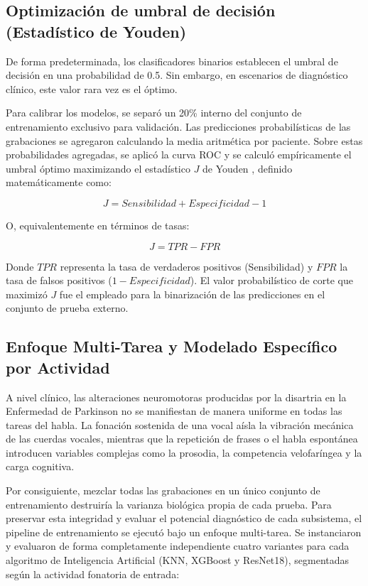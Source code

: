 \subsection{Optimización de umbral de decisión (Estadístico de Youden)}
De forma predeterminada, los clasificadores binarios establecen el umbral de decisión en una probabilidad de 0.5. Sin embargo, en escenarios de diagnóstico clínico, este valor rara vez es el óptimo.

Para calibrar los modelos, se separó un 20\% interno del conjunto de entrenamiento exclusivo para validación. Las predicciones probabilísticas de las grabaciones se agregaron calculando la media aritmética por paciente. Sobre estas probabilidades agregadas, se aplicó la curva ROC y se calculó empíricamente el umbral óptimo maximizando el estadístico $J$ de Youden \cite{youden1950}, definido matemáticamente como:

$$J = Sensibilidad + Especificidad - 1$$

O, equivalentemente en términos de tasas:

$$J = TPR - FPR$$

Donde $TPR$ representa la tasa de verdaderos positivos (Sensibilidad) y $FPR$ la tasa de falsos positivos ($1 - Especificidad$). El valor probabilístico de corte que maximizó $J$ fue el empleado para la binarización de las predicciones en el conjunto de prueba externo.

\subsection{Enfoque Multi-Tarea y Modelado Específico por Actividad}\label{sec:multitarea}

A nivel clínico, las alteraciones neuromotoras producidas por la disartria en la Enfermedad de Parkinson no se manifiestan de manera uniforme en todas las tareas del habla. La fonación sostenida de una vocal aísla la vibración mecánica de las cuerdas vocales, mientras que la repetición de frases o el habla espontánea introducen variables complejas como la prosodia, la competencia velofaríngea y la carga cognitiva.

Por consiguiente, mezclar todas las grabaciones en un único conjunto de entrenamiento destruiría la varianza biológica propia de cada prueba. Para preservar esta integridad y evaluar el potencial diagnóstico de cada subsistema, el pipeline de entrenamiento se ejecutó bajo un enfoque multi-tarea. Se instanciaron y evaluaron de forma completamente independiente cuatro variantes para cada algoritmo de Inteligencia Artificial (KNN, XGBoost y ResNet18), segmentadas según la actividad fonatoria de entrada:

